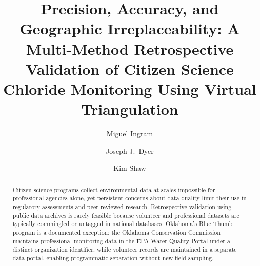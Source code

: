 \documentclass[lineno]{wlpeerj}
\begin{document}
\title{Precision, Accuracy, and Geographic Irreplaceability: A Multi-Method Retrospective Validation of Citizen Science Chloride Monitoring Using Virtual Triangulation}

\author[1]{Miguel Ingram}
\author[2]{Joseph J.\ Dyer}
\author[2]{Kim Shaw}


\begin{abstract}
Citizen science programs collect environmental data at scales impossible for professional agencies alone, yet persistent concerns about data quality limit their use in regulatory assessments and peer-reviewed research. Retrospective validation using public data archives is rarely feasible because volunteer and professional datasets are typically commingled or untagged in national databases. Oklahoma's Blue Thumb program is a documented exception: the Oklahoma Conservation Commission maintains professional monitoring data in the EPA Water Quality Portal under a distinct organization identifier, while volunteer records are maintained in a separate data portal, enabling programmatic separation without new field sampling.


\end{abstract}
\end{document}
